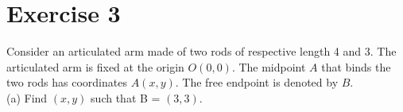 \documentclass[11pt]{article}
\begin{document}
    \section*{Exercise 3}
    Consider an articulated arm made of two rods of respective length 4 and 3. The articulated arm is fixed at the origin $O(0,0)$. The midpoint $A$ that binds the two rods has coordinates $A(x,y)$. The free endpoint is denoted by $B$.\\
    (a) Find $(x,y)$ such that B = $(3,3)$.\\
    
\end{document}
